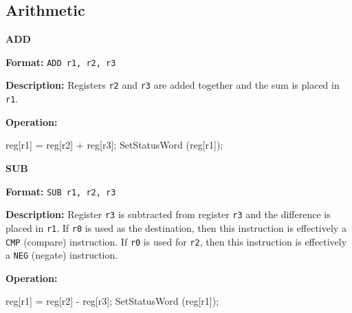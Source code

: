 \subsection{Arithmetic}
\noindent\textsf{\textbf{\Large ADD}}\par
{}\par\begin{indented}{\bf Format:}
{\tt ADD r1, r2, r3}\par\vspace{3ex}
\end{indented}\vspace{4ex}
\begin{indented}{\bf Description:}
Registers {\tt r2} and {\tt r3} are added together and the sum is placed
in {\tt r1}.
\end{indented}
\begin{indented}{\bf Operation:}\vspace{.8ex}
\begin{verbatimtab}
reg[r1] = reg[r2] + reg[r3];
SetStatusWord (reg[r1]);
\end{verbatimtab}
\end{indented}
\vspace{2em}

\newpage
\noindent\textsf{\textbf{\Large SUB}}\par
{}\par\begin{indented}{\bf Format:}
{\tt SUB r1, r2, r3}\par\vspace{3ex}
\end{indented}\vspace{4ex}
\begin{indented}{\bf Description:}
Register {\tt r3} is subtracted from register {\tt r3} and the difference is
placed in {\tt r1}.  If {\tt r0} is used as the destination, then this
instruction is effectively a {\tt CMP} (compare) instruction.  If {\tt r0}
is used for {\tt r2}, then this instruction is effectively a {\tt NEG}
(negate) instruction.
\end{indented}
\begin{indented}{\bf Operation:}\vspace{.8ex}
\begin{verbatimtab}
reg[r1] = reg[r2] - reg[r3];
SetStatusWord (reg[r1]);
\end{verbatimtab}
\end{indented}
\vspace{2em}

